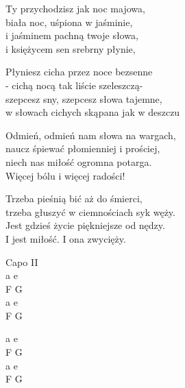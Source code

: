 \begin{text}
    \hfill\break
    Ty przychodzisz jak noc majowa,\\
    biała noc, uśpiona w jaśminie,\\
    i jaśminem pachną twoje słowa,\\
    i księżycem sen srebrny płynie,

    Płyniesz cicha przez noce bezsenne\\
    - cichą nocą tak liście szeleszczą-\\
    szepcesz sny, szepcesz słowa tajemne,\\
    w słowach cichych skąpana jak w deszczu

    Odmień, odmień nam słowa na wargach,\\
    naucz śpiewać płomienniej i prościej,\\
    niech nas miłość ogromna potarga.\\
    Więcej bólu i więcej radości!

    Trzeba pieśnią bić aż do śmierci,\\
    trzeba głuszyć w ciemnościach syk węży.\\
    Jest gdzieś życie piękniejsze od nędzy.\\
    I jest miłość. I ona zwycięży.
\end{text}
\hfill
\begin{chord}
    Capo II\\
    a e\\
    F G\\
    a e\\
    F G

    a e\\
    F G\\
    a e\\
    F G
\end{chord}